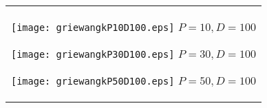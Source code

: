 \documentclass[a4paper,11pt,oneside,openany]{jsbook}
\begin{document}
\begin{figure}[htbp]
  \begin{center}
    \begin{tabular}{c}


      \begin{minipage}{0.33\hsize}
        \begin{center}
          \texttt{[image: griewangkP10D100.eps]}
          \hspace{1.2cm} $P=10, D=100$
        \end{center}
      \end{minipage}

      \begin{minipage}{0.33\hsize}
        \begin{center}
          \texttt{[image: griewangkP30D100.eps]}
          \hspace{1.2cm} $P=30, D=100$
        \end{center}
      \end{minipage}

      \begin{minipage}{0.33\hsize}
        \begin{center}
          \texttt{[image: griewangkP50D100.eps]}
          \hspace{1.2cm} $P=50, D=100$
        \end{center}
      \end{minipage}
    \end{tabular}
    \label{fig:lena}
  \end{center}
\end{figure}
\end{document}

